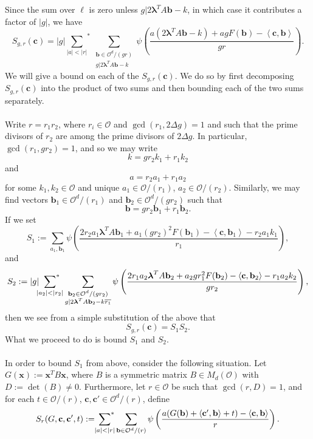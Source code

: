 \documentclass[11pt]{amsart}
\theoremstyle{plain}
\theoremstyle{plain}
\renewcommand{\vec}[1]{\mathbf{#1}}
\theoremstyle{remark}
\theoremstyle{definition}
\newcommand{\sumstar}{\sideset{}{^*}\sum}
\begin{document}
Since the sum over $\ell$ is zero unless $g|2\boldsymbol{\lambda}^TA\vec{b}-k$, in which case it contributes a factor of $|g|$, we have
\[S_{g,r}(\vec{c})=|g|{\sum_{|a|<|r|}}^*\sum_{\substack{\vec{b}\in \mathcal{O}^d/(gr)\\ g|2\boldsymbol{\lambda}^TA\vec{b}-k}} \psi\left(\frac{a(2\boldsymbol{\lambda}^T A\vec{b}-k) + ag F(\vec{b})-\left< \vec{c},\vec{b} \right>} {gr}\right).\]
We will give a bound on each of the $S_{g,r}(\vec{c})$. We do so by first decomposing $S_{g,r}(\vec{c})$ into the product of two sums and then bounding each of the two sums separately.\\
\\
Write $r=r_1r_2$, where $r_i\in\mathcal{O}$ and $\gcd(r_1,2\Delta g)=1$ and such that the prime divisors of $r_2$ are among the prime divisors of $2\Delta g$. In particular, $\gcd(r_1,gr_2)=1$, and so we may write
\[k=gr_2k_1+r_1k_2\]
and
\[a=r_2a_1+r_1a_2\]
for some $k_1,k_2\in\mathcal{O}$ and unique $a_1\in\mathcal{O}/(r_1)$, $a_2\in\mathcal{O}/(r_2)$. Similarly, we may find vectors $\vec{b}_1\in\mathcal{O}^d/(r_1)$ and $\vec{b}_2\in\mathcal{O}^d/(gr_2)$ such that
\[\vec{b}=gr_2\vec{b}_1+r_1\vec{b}_2.\]
If we set
\begin{equation}\label{S1}
S_1:=\sum_{a_1,\vec{b}_1} \psi\left(\frac{2r_2a_1\boldsymbol{\lambda}^TA\vec{b}_1+a_1(gr_2)^2F(\vec{b}_1)-\left<\vec{c},\vec{b}_1\right>-r_2a_1k_1    }{r_1}\right),
\end{equation}
and 
\begin{equation}\label{S2}
S_2:=|g|\sumstar_{|a_2|<|r_2|}\sum_{\substack{\vec{b}_2\in \mathcal{O}^d/(gr_2)\\ g|2\boldsymbol{\lambda}^TA\vec{b}_2-k\overline{r_1}}}  \psi\left(\frac{2r_1a_2\boldsymbol{\lambda}^TA\vec{b}_2+a_2gr_1^2F(\vec{b}_2)-\left<\vec{c},\vec{b}_2\right>-r_1a_2k_2}{gr_2}\right),
\end{equation}
then we see from a simple substitution of the above that
\[S_{g,r}(\vec{c})=S_1S_2.\]
What we proceed to do is bound $S_1$ and $S_2$.\\
\\
In order to bound $S_1$ from above, consider the following situation. Let $G(\vec{x}):=\vec{x}^TB\vec{x}$, where $B$ is a symmetric matrix $B\in M_d(\mathcal{O})$ with $D:=\det(B)\neq 0$. Furthermore, let $r\in\mathcal{O}$ be such that $\gcd(r,D)=1$, and for each $t\in\mathcal{O}/(r)$, $\vec{c},\vec{c}'\in\mathcal{O}^d/(r)$, define
\[S_r(G,\vec{c},\vec{c}',t):=\sumstar_{|a|<|r|}\sum_{\vec{b}\in\mathcal{O}^d/(r)} \psi\left(\frac{a(G(\vec{b})+\left<\vec{c}^{\prime},\vec{b}\right>+t)-\left<\vec{c},\vec{b}\right>}{r}\right).\]
\end{document}
